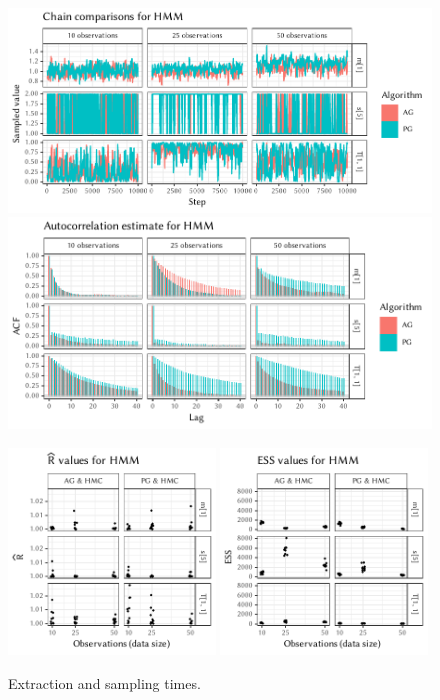 \begin{figure}[p]
  \centering
  \includegraphics[width=\textwidth]{figures/HMM-chains}
  \par
  \includegraphics[width=\textwidth]{figures/HMM-acfs}
  \par
  \includegraphics[width=0.49\textwidth]{figures/HMM-rhat}
  \includegraphics[width=0.49\textwidth]{figures/HMM-ess}
  \caption{Extraction and sampling times.}
\end{figure}

